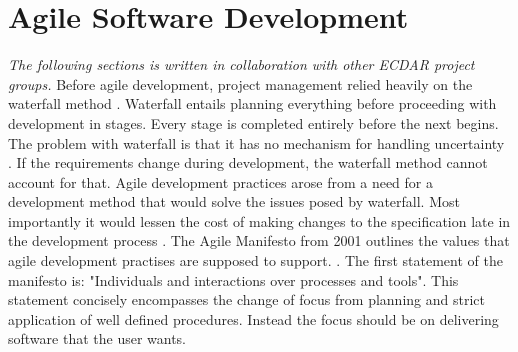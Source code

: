\section{Agile Software Development}\label{sec:agile-software-development}
\textit{The following sections is written in collaboration with other ECDAR project groups.}
Before agile development, project management relied heavily on the waterfall method \cite{sommerville}. Waterfall entails planning everything before proceeding with development in stages. Every stage is completed entirely before the next begins. The problem with waterfall is that it has no mechanism for handling uncertainty \cite{sommerville}. If the requirements change during development, the waterfall method cannot account for that. Agile development practices arose from a need for a development method that would solve the issues posed by waterfall. Most importantly it would lessen the cost of making changes to the specification late in the development process \cite{alancline}. The Agile Manifesto from 2001 outlines the values that agile development practises are supposed to support. \cite{beck2001agile}. The first statement of the manifesto is: "Individuals and interactions over processes and tools"\cite{beck2001agile}. This statement concisely encompasses the change of focus from planning and strict application of well defined procedures. Instead the focus should be on delivering software that the user wants.
